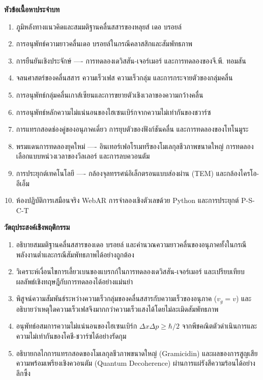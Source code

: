 \begin{lessonplanbox}
\noindent\textbf{หัวข้อเนื้อหาประจำบท}
\begin{enumerate}
    \item ภูมิหลังทางแนวคิดและสมมติฐานคลื่นสสารของหลุยส์ เดอ บรอยล์
    \item การอนุพัทธ์ความยาวคลื่นเดอ บรอยล์ในกรณีคลาสสิกและสัมพัทธภาพ
    \item การยืนยันเชิงประจักษ์ ---- การทดลองเดวิสสัน-เจอร์เมอร์ และการทดลองของจี.พี. ทอมสัน
    \item จลนศาสตร์ของคลื่นสสาร ความเร็วเฟส ความเร็วกลุ่ม และการกระจายตัวของกลุ่มคลื่น
    \item การอนุพัทธ์กลุ่มคลื่นเกาส์เซียนและการขยายตัวเชิงเวลาของความกว้างคลื่น
    \item การอนุพัทธ์หลักความไม่แน่นอนของไฮเซนเบิร์กจากความไม่เท่ากันของชวาร์ซ
    \item การแทรกสอดช่องคู่ของอนุภาคเดี่ยว การยุบตัวของฟังก์ชันคลื่น และการทดลองของโทโนมูระ
    \item พรมแดนการทดลองยุคใหม่ ---- อินเทอร์เฟอโรเมทรีของโมเลกุลชีวภาพขนาดใหญ่ การทดลองเลือกแบบหน่วงเวลาของวีลเลอร์ และการลบควอนตัม
    \item การประยุกต์เทคโนโลยี ---- กล้องจุลทรรศน์อิเล็กตรอนแบบส่องผ่าน (TEM) และกล้องไครโอ-อีเอ็ม
    \item ห้องปฏิบัติการเสมือนจริง WebAR การจำลองเชิงตัวเลขด้วย Python และการประยุกต์ P-S-C-T
\end{enumerate}

\noindent\textbf{วัตถุประสงค์เชิงพฤติกรรม}
\begin{enumerate}
    \item อธิบายสมมติฐานคลื่นสสารของเดอ บรอยล์ และคำนวณความยาวคลื่นของอนุภาคทั้งในกรณีพลังงานต่ำและกรณีสัมพัทธภาพได้อย่างถูกต้อง
    \item วิเคราะห์เงื่อนไขการเลี้ยวเบนของแบรกก์ในการทดลองเดวิสสัน-เจอร์เมอร์ และเปรียบเทียบผลลัพธ์เชิงทฤษฎีกับการทดลองได้อย่างแม่นยำ
    \item พิสูจน์ความสัมพันธ์ระหว่างความเร็วกลุ่มของคลื่นสสารกับความเร็วของอนุภาค ($v_g = v$) และอธิบายว่าเหตุใดความเร็วเฟสจึงมากกว่าความเร็วแสงได้โดยไม่ละเมิดสัมพัทธภาพ
    \item อนุพัทธ์อสมการความไม่แน่นอนของไฮเซนเบิร์ก $\Delta x \Delta p \ge \hbar/2$ จากพีชคณิตตัวดำเนินการและความไม่เท่ากันของโคชี-ชวาร์ซได้อย่างรัดกุม
    \item อธิบายกลไกการแทรกสอดของโมเลกุลชีวภาพขนาดใหญ่ (Gramicidin) และผลของการสูญเสียความพร้อมเพรียงเชิงควอนตัม (Quantum Decoherence) ผ่านการแผ่รังสีความร้อนได้อย่างลึกซึ้ง
\end{enumerate}
\end{lessonplanbox}

